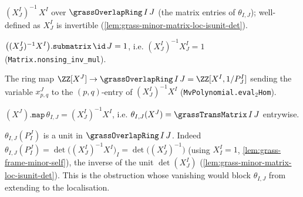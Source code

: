 \begin{definition}
  \label{def:grass-trans-matrix}
  $(X^I_J)^{-1}\,X^I$ over $\grassOverlapRing\,I\,J$ (the matrix entries of
  $\theta_{I,J}$); well-defined as $X^I_J$ is invertible
  (\cref{lem:grass-minor-matrix-loc-isunit-det}).
\end{definition}

\begin{lemma}
  \label{lem:grass-trans-matrix-submatrix-self}
  $\big((X^I_J)^{-1}X^I\big).\mathtt{submatrix}\,\id\,J = 1$, i.e.
  $(X^I_J)^{-1}X^I_J = 1$ (\texttt{Matrix.nonsing\_inv\_mul}).
\end{lemma}

\begin{definition}
  \label{def:grass-trans-aux}
  The ring map $\ZZ[X^J]\to\grassOverlapRing\,I\,J = \ZZ[X^I,1/P^I_J]$ sending
  the variable $x^J_{p,q}$ to the $(p,q)$-entry of $(X^I_J)^{-1}X^I$
  (\texttt{MvPolynomial.eval}$_2$\texttt{Hom}).
\end{definition}

\begin{lemma}
  \label{lem:grass-trans-aux-map-frame}
  $(X^J).\mathtt{map}\,\theta_{I,J} = (X^I_J)^{-1}X^I$, i.e.
  $\theta_{I,J}(X^J) = \grassTransMatrix\,I\,J$ entrywise.
\end{lemma}

\begin{lemma}
  \label{lem:grass-trans-aux-minor-isunit}
  $\theta_{I,J}(P^J_I)$ is a unit in $\grassOverlapRing\,I\,J$. Indeed
  $\theta_{I,J}(P^J_I) = \det\big((X^I_J)^{-1}X^I\big)_I =
  \det\big((X^I_J)^{-1}\big)$ (using $X^I_I = 1$,
  \cref{lem:grass-frame-minor-self}), the inverse of the unit $\det(X^I_J)$
  (\cref{lem:grass-minor-matrix-loc-isunit-det}). This is the obstruction whose
  vanishing would block $\theta_{I,J}$ from extending to the localisation.
\end{lemma}

